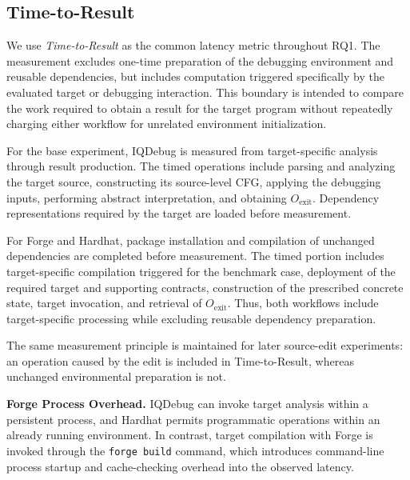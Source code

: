 \documentclass[11pt,oneside]{report}
\theoremstyle{plain}
\theoremstyle{definition}
\theoremstyle{remark}
\begin{document}

\subsection{Time-to-Result}
\label{subsec:eval:rq1:time}

We use \textit{Time-to-Result} as the common latency metric throughout RQ1. The measurement excludes one-time preparation of the debugging environment and reusable dependencies, but includes computation triggered specifically by the evaluated target or debugging interaction. This boundary is intended to compare the work required to obtain a result for the target program without repeatedly charging either workflow for unrelated environment initialization.

For the base experiment, IQDebug is measured from target-specific analysis through result production. The timed operations include parsing and analyzing the target source, constructing its source-level CFG, applying the debugging inputs, performing abstract interpretation, and obtaining \(O_{\mathrm{exit}}\). Dependency representations required by the target are loaded before measurement.

For Forge and Hardhat, package installation and compilation of unchanged dependencies are completed before measurement. The timed portion includes target-specific compilation triggered for the benchmark case, deployment of the required target and supporting contracts, construction of the prescribed concrete state, target invocation, and retrieval of \(O_{\mathrm{exit}}\). Thus, both workflows include target-specific processing while excluding reusable dependency preparation.

The same measurement principle is maintained for later source-edit experiments: an operation caused by the edit is included in Time-to-Result, whereas unchanged environmental preparation is not.

\medskip
\noindent\textbf{Forge Process Overhead.}
IQDebug can invoke target analysis within a persistent process, and Hardhat permits programmatic operations within an already running environment. In contrast, target compilation with Forge is invoked through the \texttt{forge build} command, which introduces command-line process startup and cache-checking overhead into the observed latency.
\end{document}
